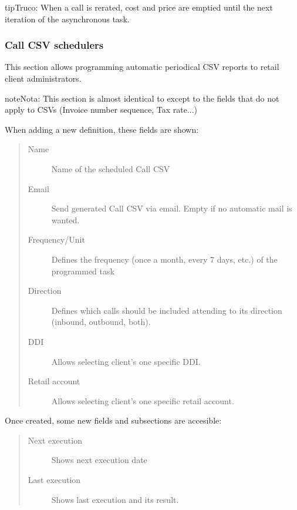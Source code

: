 \documentclass[letterpaper,10pt,spanish]{sphinxmanual}
\begin{document}
\begin{notice}{tip}{Truco:}
When a call is rerated, cost and price are emptied until the next iteration of the asynchronous task.
\end{notice}


\subsubsection{Call CSV schedulers}
\label{administration_portal/client/retail/calls/call_csv_schedulers:call-csv-schedulers}\label{administration_portal/client/retail/calls/call_csv_schedulers::doc}
This section allows programming automatic periodical CSV reports to retail client administrators.

\begin{notice}{note}{Nota:}
This section is almost identical to {\hyperref[administration_portal/brand/invoicing/invoice_schedulers:invoice\string-schedulers]{}} except to the
fields that do not apply to CSVs (Invoice number sequence, Tax rate...)
\end{notice}

When adding a new definition, these fields are shown:
\begin{quote}
\begin{description}
\item[{Name}] \leavevmode
Name of the scheduled Call CSV

\item[{Email}] \leavevmode
Send generated Call CSV via email. Empty if no automatic mail is wanted.

\item[{Frequency/Unit}] \leavevmode
Defines the frequency (once a month, every 7 days, etc.) of the programmed task

\item[{Direction}] \leavevmode
Defines which calls should be included attending to its direction (inbound, outbound, both).

\item[{DDI}] \leavevmode
Allows selecting client's one specific DDI.

\item[{Retail account}] \leavevmode
Allows selecting client's one specific retail account.

\end{description}
\end{quote}

Once created, some new fields and subsections are accesible:
\begin{quote}
\begin{description}
\item[{Next execution}] \leavevmode
Shows next execution date

\item[{Last execution}] \leavevmode
Shows last execution and its result.

\end{description}
\end{quote}
\end{document}
